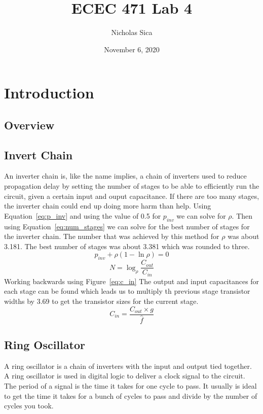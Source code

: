 \documentclass[12pt]{article}
\begin{document}
\title{ECEC 471 Lab 4}
\author{Nicholas Sica}
\date{November 6, 2020}
\maketitle

\section{Introduction}
\subsection{Overview}
\subsection{Invert Chain}
An inverter chain is, like the name implies, a chain of inverters used to reduce propagation delay by setting
the number of stages to be able to efficiently run the circuit, given a certain input and ouput capacitance.
If there are too many stages, the inverter chain could end up doing more harm than help. Using Equation~\ref{eq:p_inv}
and using the value of 0.5 for $p_{inv}$ we can solve for $\rho$. Then using Equation~\ref{eq:num_stages} we can solve
for the best number of stages for the inverter chain. The number that was achieved by this method for $\rho$ was about
3.181. The best number of stages was about 3.381 which was rounded to three. 
\begin{equation} \label{eq:p_inv}
    p_{inv} + \rho(1 - \ln\rho) = 0
\end{equation}
\begin{equation} \label{eq:num_stages}
    N = \log_{\rho}{\frac{C_{out}}{C_{in}}}
\end{equation}
Working backwards using Figure~\ref{eq:c_in}
The output and input capacitances for each stage can be found which leads us to multiply th previous stage transistor
widths by 3.69 to get the transistor sizes for the current stage.
\begin{equation} \label{eq:c_in}
    C_{in} = \frac{C_{out} \times g}{\hat{f}}
\end{equation}
\subsection{Ring Oscillator}
A ring oscillator is a chain of inverters with the input and output tied together. A ring oscillator is used in digital
logic to deliver a clock signal to the circuit. The period of a signal is the time it takes for one cycle to pass. It usually
is ideal to get the time it takes for a bunch of cycles to pass and divide by the number of cycles you took.
\end{document}
